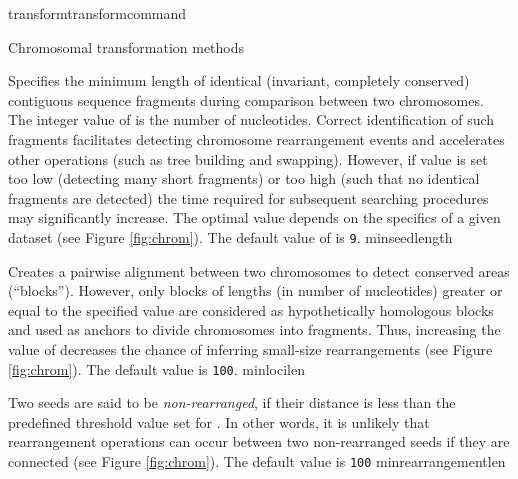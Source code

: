 \begin{command}{transform}{transformcommand}
\begin{arguments}
\begin{argumentgroup}{Chromosomal transformation methods}
\begin{description}
                        {Specifies the minimum length of identical (invariant,
                        completely conserved) contiguous sequence fragments
                        during comparison between two chromosomes. The integer
                        value of  is the number of
                        nucleotides. Correct identification of such fragments
                        facilitates detecting chromosome rearrangement events and
                        accelerates other operations (such as tree building and
                        swapping). However, if  value
                        is set too low (detecting many short fragments) or
                        too high (such that no identical fragments are detected)
                        the time required for subsequent searching procedures
                        may significantly increase. The optimal  
                        value depends on the specifics of  a given dataset (see Figure \ref{fig:chrom}).
                        The default value of  is \texttt{9}.}
                        {minseedlength}

                          {Creates a pairwise alignment between two chromosomes to
                          detect conserved areas (``blocks''). However, only blocks of
                          lengths (in number of nucleotides) greater or equal to the specified 
                          value are considered as hypothetically
                          homologous blocks and used as anchors to divide chromosomes into
                          fragments. Thus, increasing the value of  decreases
                           the chance of inferring small-size rearrangements (see Figure \ref{fig:chrom}). 
                           The default value is \texttt{100}.} 
                           {minlocilen}
                           
                            {Two seeds are said to be \emph{non-rearranged}, 
               	           if their distance is less than the predefined threshold value set
	                    for .  In other words, it is unlikely 
	                    that rearrangement operations can occur between two non-rearranged seeds
	                    if they are connected (see Figure \ref{fig:chrom}).
	                    The default value is \texttt{100}}
                             {minrearrangementlen}



\end{description}
\end{argumentgroup}
\end{arguments}
\end{command}
